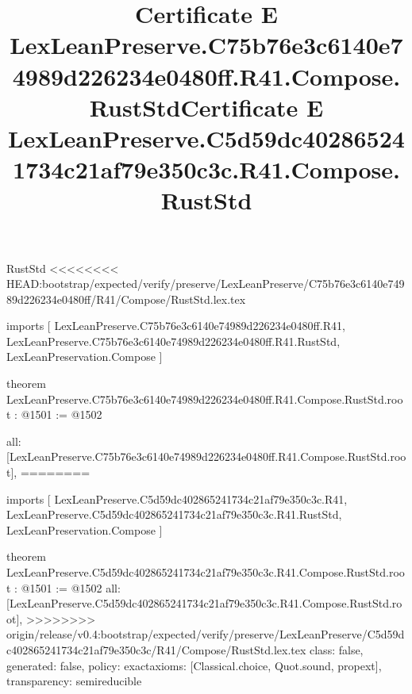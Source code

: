 \begin{lexlean}{RustStd}
<<<<<<<< HEAD:bootstrap/expected/verify/preserve/LexLeanPreserve/C75b76e3c6140e74989d226234e0480ff/R41/Compose/RustStd.lex.tex
\title{Certificate E LexLeanPreserve.C75b76e3c6140e74989d226234e0480ff.R41.Compose.RustStd}
\begin{coremodule}
imports [
  LexLeanPreserve.C75b76e3c6140e74989d226234e0480ff.R41,
  LexLeanPreserve.C75b76e3c6140e74989d226234e0480ff.R41.RustStd,
  LexLeanPreservation.Compose
]

theorem LexLeanPreserve.C75b76e3c6140e74989d226234e0480ff.R41.Compose.RustStd.root : @1501 := @1502 {
  all: [LexLeanPreserve.C75b76e3c6140e74989d226234e0480ff.R41.Compose.RustStd.root],
========
\title{Certificate E LexLeanPreserve.C5d59dc402865241734c21af79e350c3c.R41.Compose.RustStd}
\begin{coremodule}
imports [
  LexLeanPreserve.C5d59dc402865241734c21af79e350c3c.R41,
  LexLeanPreserve.C5d59dc402865241734c21af79e350c3c.R41.RustStd,
  LexLeanPreservation.Compose
]

theorem LexLeanPreserve.C5d59dc402865241734c21af79e350c3c.R41.Compose.RustStd.root : @1501 := @1502 {
  all: [LexLeanPreserve.C5d59dc402865241734c21af79e350c3c.R41.Compose.RustStd.root],
>>>>>>>> origin/release/v0.4:bootstrap/expected/verify/preserve/LexLeanPreserve/C5d59dc402865241734c21af79e350c3c/R41/Compose/RustStd.lex.tex
  class: false,
  generated: false,
  policy: exact{axioms: [Classical.choice, Quot.sound, propext]},
  transparency: semireducible
}


\end{coremodule}}
\end{coremodule}
\end{lexlean}
